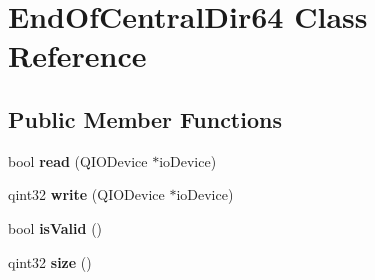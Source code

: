 \hypertarget{class_end_of_central_dir64}{}\section{End\+Of\+Central\+Dir64 Class Reference}
\label{class_end_of_central_dir64}
\subsection*{Public Member Functions}
\begin{DoxyCompactItemize}
\item 
bool {\bfseries read} (Q\+I\+O\+Device $\ast$io\+Device)\hypertarget{class_end_of_central_dir64_add401cb67034b704a2bc1cb2761bde50}{}\label{class_end_of_central_dir64_add401cb67034b704a2bc1cb2761bde50}

\item 
qint32 {\bfseries write} (Q\+I\+O\+Device $\ast$io\+Device)\hypertarget{class_end_of_central_dir64_ae645518e43ca1afc24bcd6d7e3650497}{}\label{class_end_of_central_dir64_ae645518e43ca1afc24bcd6d7e3650497}

\item 
bool {\bfseries is\+Valid} ()\hypertarget{class_end_of_central_dir64_af2b2e21b8ba16f2a3434ecdd3d188277}{}\label{class_end_of_central_dir64_af2b2e21b8ba16f2a3434ecdd3d188277}

\item 
qint32 {\bfseries size} ()\hypertarget{class_end_of_central_dir64_a094b2e1419dc41b2bed593649c1bc7b1}{}\label{class_end_of_central_dir64_a094b2e1419dc41b2bed593649c1bc7b1}

\end{DoxyCompactItemize}

